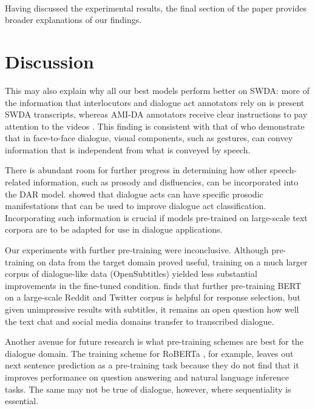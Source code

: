 \documentclass[11pt,a4paper]{article}
\begin{document}
\paragraph{}
Having discussed the experimental results, the final section of the paper provides broader explanations of our findings.


\section{Discussion} %

This may also explain why all our best models perform better on SWDA: more of the information that interlocutors and dialogue act annotators rely on is present SWDA transcripts, whereas AMI-DA annotators receive clear instructions to pay attention to the videos \citep{GuidelinesDialogueAct2005}.
This finding is consistent with that of \citet{bavelas2008gesturing} who demonstrate that in face-to-face dialogue, visual components, such as gestures, can convey information that is independent from what is conveyed by speech.

There is abundant room for further progress in determining how other speech-related information, such as prosody and disfluencies, can be incorporated into the DAR model.
\citet{stolckeDialogueActModeling2000} showed that dialogue acts can have specific prosodic manifestations that can be used to improve dialogue act classification.
Incorporating such information is crucial if models pre-trained on large-scale text corpora are to be adapted for use in dialogue applications.

Our experiments with further pre-training were inconclusive. 
Although pre-training on data from the target domain proved useful, training on a much larger corpus of dialogue-like data (OpenSubtitles) yielded less substantial improvements in the fine-tuned condition.
\citet{baoPLATOPretrainedDialogue2019} finds that further pre-training BERT on a large-scale Reddit and Twitter corpus is helpful for response selection, but given unimpressive results with subtitles, it remains an open question how well the text chat and social media domains transfer to transcribed dialogue.

Another avenue for future research is what pre-training schemes are best for the dialogue domain.
The training scheme for RoBERTa \citep{liuRoBERTaRobustlyOptimized2019}, for example, leaves out next sentence prediction as a pre-training task because they do not find that it improves performance on question answering and natural language inference tasks.
The same may not be true of dialogue, however, where sequentiality is essential.



\appendix
\onecolumn



\end{document}
